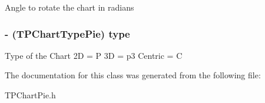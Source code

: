 Angle to rotate the chart in radians \hypertarget{interface_t_p_chart_pie_f9a2aea3325ac699501b0cbea394e0d7}{
\subsubsection[{type}]{\setlength{\rightskip}{0pt plus 5cm}- (TPChartTypePie) type}}
\label{interface_t_p_chart_pie_f9a2aea3325ac699501b0cbea394e0d7}


Type of the Chart 2D = P 3D = p3 Centric = C 

The documentation for this class was generated from the following file:\begin{CompactItemize}
\item 
TPChartPie.h\end{CompactItemize}

